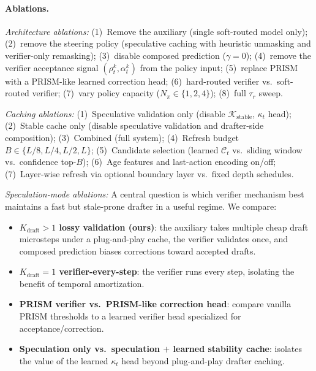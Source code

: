 \documentclass[11pt]{article}
\newcommand{\cK}{\mathcal{K}}
\newcommand{\cC}{\mathcal{C}}
\begin{document}
\paragraph{Ablations.}
\emph{Architecture ablations:}
(1)~Remove the auxiliary (single soft-routed model only);
(2)~remove the steering policy (speculative caching with heuristic unmasking and verifier-only remasking);
(3)~disable composed prediction ($\gamma = 0$);
(4)~remove the verifier acceptance signal $(\rho_t^k, \alpha_t^k)$ from the policy input;
(5)~replace PRISM with a PRISM-like learned correction head;
(6)~hard-routed verifier vs.\ soft-routed verifier;
(7)~vary policy capacity ($N_\pi \in \{1, 2, 4\}$);
(8)~full $\tau_r$ sweep.

\emph{Caching ablations:}
(1)~Speculative validation only (disable $\cK_{\text{stable}}$, $\kappa_t$ head);
(2)~Stable cache only (disable speculative validation and drafter-side composition);
(3)~Combined (full system);
(4)~Refresh budget $B \in \{L/8, L/4, L/2, L\}$;
(5)~Candidate selection (learned $\cC_t$ vs.\ sliding window vs.\ confidence top-$B$);
(6)~Age features and last-action encoding on/off;
(7)~Layer-wise refresh via optional boundary layer vs.\ fixed depth schedules.

\emph{Speculation-mode ablations:}
A central question is which verifier mechanism best maintains a fast but stale-prone drafter in a useful regime.
We compare:
\begin{itemize}[leftmargin=*,itemsep=1pt]
    \item \textbf{$K_{\text{draft}}{>}1$ lossy validation (ours)}: the auxiliary takes multiple cheap draft microsteps under a plug-and-play cache, the verifier validates once, and composed prediction biases corrections toward accepted drafts.
    \item \textbf{$K_{\text{draft}}{=}1$ verifier-every-step}: the verifier runs every step, isolating the benefit of temporal amortization.
    \item \textbf{PRISM verifier vs.\ PRISM-like correction head}: compare vanilla PRISM thresholds to a learned verifier head specialized for acceptance/correction.
    \item \textbf{Speculation only vs.\ speculation $+$ learned stability cache}: isolates the value of the learned $\kappa_t$ head beyond plug-and-play drafter caching.
\end{itemize}
\end{document}
